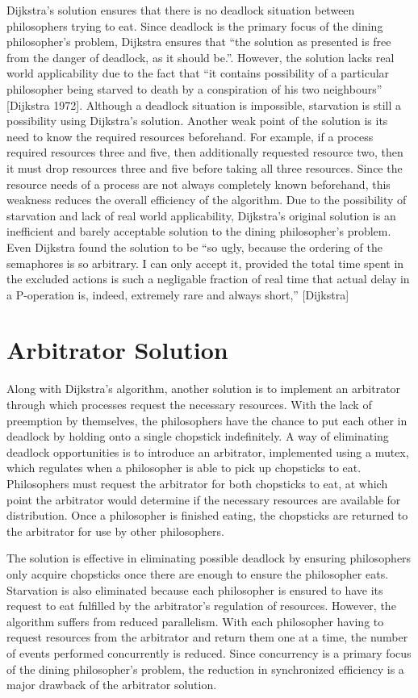 \documentclass{article}
\begin{document}
Dijkstra's solution ensures that there is no deadlock situation between philosophers trying to eat. Since deadlock is the primary focus of the dining philosopher's problem, Dijkstra ensures that ``the solution as presented is free from the danger of deadlock, as it should be.''. However, the solution lacks real world applicability due to the fact that ``it contains possibility of a particular philosopher being starved to death by a conspiration of his two neighbours'' [Dijkstra 1972]. Although a deadlock situation is impossible, starvation is still a possibility using Dijkstra's solution. Another weak point of the solution is its need to know the required resources beforehand. For example, if a process required resources three and five, then additionally requested resource two, then it must drop resources three and five before taking all three resources. Since the resource needs of a process are not always completely known beforehand, this weakness reduces the overall efficiency of the algorithm. Due to the possibility of starvation and lack of real world applicability, Dijkstra's original solution is an inefficient and barely acceptable solution to the dining philosopher's problem. Even Dijkstra found the solution to be ``so ugly, because the ordering of the semaphores is so arbitrary. I can only accept it, provided the total time spent in the excluded actions is such a negligable fraction of real time that actual delay in a P-operation is, indeed, extremely rare and always short,'' [Dijkstra]

\section{Arbitrator Solution} Along with Dijkstra's algorithm, another solution is to implement an arbitrator through which processes request the necessary resources. With the lack of preemption by themselves, the philosophers have the chance to put each other in deadlock by holding onto a single chopstick indefinitely. A way of eliminating deadlock opportunities is to introduce an arbitrator, implemented using a mutex, which regulates when a philosopher is able to pick up chopsticks to eat. Philosophers must request the arbitrator for both chopsticks to eat, at which point the arbitrator would determine if the necessary resources are available for distribution. Once a philosopher is finished eating, the chopsticks are returned to the arbitrator for use by other philosophers.

The solution is effective in eliminating possible deadlock by ensuring philosophers only acquire chopsticks once there are enough to ensure the philosopher eats. Starvation is also eliminated because each philosopher is ensured to have its request to eat fulfilled by the arbitrator's regulation of resources. However, the algorithm suffers from reduced parallelism. With each philosopher having to request resources from the arbitrator and return them one at a time, the number of events performed concurrently is reduced. Since concurrency is a primary focus of the dining philosopher's problem, the reduction in synchronized efficiency is a major drawback of the arbitrator solution.
\end{document}
